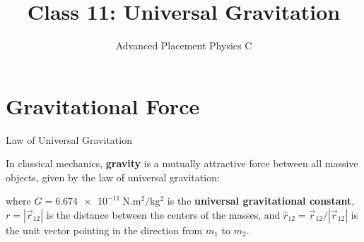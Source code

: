 \documentclass[12pt,compress,aspectratio=169]{beamer}
\title{Class 11: Universal Gravitation}
\subtitle{Advanced Placement Physics C}
\begin{document}
\begin{frame}
  \maketitle
\end{frame}


\section{Gravitational Force}

\begin{frame}{Law of Universal Gravitation}
  \begin{center}
  \end{center}

  In classical mechanics, \textbf{gravity} is a mutually attractive force
  between all massive objects, given by the law of universal gravitation:


  where $G=\SI{6.674e-11}{\newton.\metre\squared\per\kilo\gram\squared}$ is the
  \textbf{universal gravitational constant}, $r=|\vec r_{12}|$ is the distance
  between the centers of the masses, and $\hat r_{12}=\vec r_{12}/|\vec r_{12}|$
  is the unit vector pointing in the direction from $m_1$ to $m_2$.
\end{frame}
\end{document}
